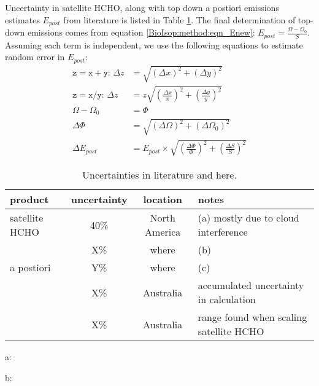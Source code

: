     Uncertainty in satellite HCHO, along with top down a postiori emissions estimates $E_{post}$ from literature is listed in Table \ref{BioIsop:uncertainty:eomi:tab_lit_uncertainties}.
    The final determination of top-down emissions comes from equation \ref{BioIsop:method:eqn_Enew}: $E_{post}=\frac{\Omega - \Omega_{0}}{S}$.
    Assuming each term is independent, we use the following equations to estimate random error in $E_{post}$:
    \begin{align*}
      \mathtt{z=x+y:} \, \Delta{z} & = \sqrt{(\Delta{x})^2 + (\Delta{y})^2} \\
      \mathtt{z=x/y:} \, \Delta{z} & = z \sqrt{(\frac{\Delta{x}}{x})^2 + (\frac{\Delta{y}}{y})^2} \\
      \Omega - \Omega_{0} & = \Phi \\
      \Delta{\Phi} & = \sqrt{(\Delta{\Omega})^2 + (\Delta{\Omega_{0}})^2} \\
      \Delta{E_{post}} &= E_{post} \times \sqrt{(\frac{\Delta{\Phi}}{\Phi})^2 + (\frac{\Delta{S}}{S})^2}
    \end{align*}
    
    \begin{table}\begin{threeparttable}
      \caption{Uncertainties in literature and here.}
      \begin{tabular}{ l | c  c  l } 
        \toprule
        product & uncertainty & location & notes \\
        \midrule
        satellite HCHO & 40\% & North America & (a) mostly due to cloud interference \\
         & X\% & where & (b) \\
        a postiori & Y\% & where & (c) \\
         & X\% & Australia & accumulated uncertainty in calculation \\
         & X\% & Australia & range found when scaling satellite HCHO \\
        \bottomrule
      \end{tabular}
      \begin{tablenotes} 
        \item a: \textcite{Millet2006,Palmer2006}
        \item b: 
      \end{tablenotes}
      \label{BioIsop:uncertainty:eomi:tab_lit_uncertainties}
    \end{threeparttable}\end{table}
    
